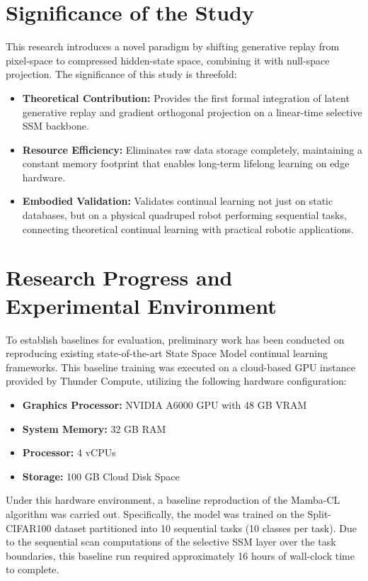 \section{Significance of the Study}
\label{sec:significance}

This research introduces a novel paradigm by shifting generative replay from pixel-space to compressed hidden-state space, combining it with null-space projection. The significance of this study is threefold:
\begin{itemize}
    \item \textbf{Theoretical Contribution:} Provides the first formal integration of latent generative replay and gradient orthogonal projection on a linear-time selective SSM backbone.
    
    \item \textbf{Resource Efficiency:} Eliminates raw data storage completely, maintaining a constant memory footprint that enables long-term lifelong learning on edge hardware.
    
    \item \textbf{Embodied Validation:} Validates continual learning not just on static databases, but on a physical quadruped robot performing sequential tasks, connecting theoretical continual learning with practical robotic applications.
\end{itemize}

\section{Research Progress and Experimental Environment}
\label{sec:progress}

To establish baselines for evaluation, preliminary work has been conducted on reproducing existing state-of-the-art State Space Model continual learning frameworks. This baseline training was executed on a cloud-based GPU instance provided by Thunder Compute, utilizing the following hardware configuration:
\begin{itemize}
    \item \textbf{Graphics Processor:} NVIDIA A6000 GPU with 48 GB VRAM
    \item \textbf{System Memory:} 32 GB RAM
    \item \textbf{Processor:} 4 vCPUs
    \item \textbf{Storage:} 100 GB Cloud Disk Space
\end{itemize}

Under this hardware environment, a baseline reproduction of the Mamba-CL algorithm was carried out. Specifically, the model was trained on the Split-CIFAR100 dataset partitioned into 10 sequential tasks (10 classes per task). Due to the sequential scan computations of the selective SSM layer over the task boundaries, this baseline run required approximately 16 hours of wall-clock time to complete. 

